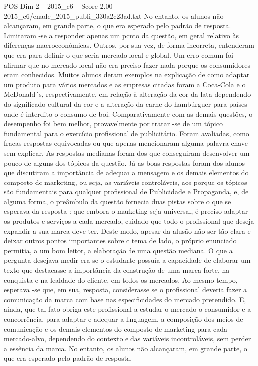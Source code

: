 \begin{textsample}{POS Dim 2 – 2015\_c6 – Score 2.00 – 2015\_c6/enade\_2015\_publi\_330a2c23ad.txt}
No entanto, os alunos não alcançaram, em grande parte, o que era esperado pelo padrão de resposta.
Limitaram -se a responder apenas um ponto da questão, em geral relativo às diferenças macroeconômicas.
Outros, por sua vez, de forma incorreta, entenderam que era para definir o que seria mercado local e global.
Um erro comum foi afirmar que no mercado local não era preciso fazer nada porque os consumidores eram conhecidos.
Muitos alunos deram exemplos na explicação de como adaptar um produto para vários mercados e as empresas citadas foram a Coca-Cola e o McDonald´s, respectivamente, em relação à alteração da cor da lata dependendo do significado cultural da cor e a alteração da carne do hambúrguer para países onde é interdito o consumo de boi.
Comparativamente com as demais questões, o desempenho foi bem melhor, provavelmente por tratar -se de um tópico fundamental para o exercício profissional de publicitário.
Foram avaliadas, como fracas respostas equivocadas ou que apenas mencionaram alguma palavra chave sem explicar.
As respostas medianas foram dos que conseguiram desenvolver um pouco de alguns dos tópicos da questão.
Já as boas respostas foram dos alunos que discutiram a importância de adequar a mensagem e os demais elementos do composto de marketing, ou seja, as variáveis controláveis, aos porque os tópicos são fundamentais para qualquer profissional de Publicidade e Propaganda, e, de alguma forma, o preâmbulo da questão fornecia duas pistas sobre o que se esperava da resposta : que embora o marketing seja universal, é preciso adaptar os produtos e serviços a cada mercado, cuidado que todo o profissional que deseja expandir a sua marca deve ter.
Deste modo, apesar da alusão não ser tão clara e deixar outros pontos importantes sobre o tema de lado, o próprio enunciado permitia, a um bom leitor, a elaboração de uma questão mediana.
O que a pergunta desejava medir era se o estudante possuía a capacidade de elaborar um texto que destacasse a importância da construção de uma marca forte, na conquista e na lealdade do cliente, em todos os mercados.
Ao mesmo tempo, esperava -se que, em sua, resposta, considerasse se o profissional deveria fazer a comunicação da marca com base nas especificidades do mercado pretendido.
E, ainda, que tal fato obriga este profissional a estudar o mercado o consumidor e a concorrência, para adaptar e adequar a linguagem, a composição dos meios de comunicação e os demais elementos do composto de marketing para cada mercado-alvo, dependendo do contexto e das variáveis incontroláveis, sem perder a essência da marca.
No entanto, os alunos não alcançaram, em grande parte, o que era esperado pelo padrão de resposta.

\end{textsample}
